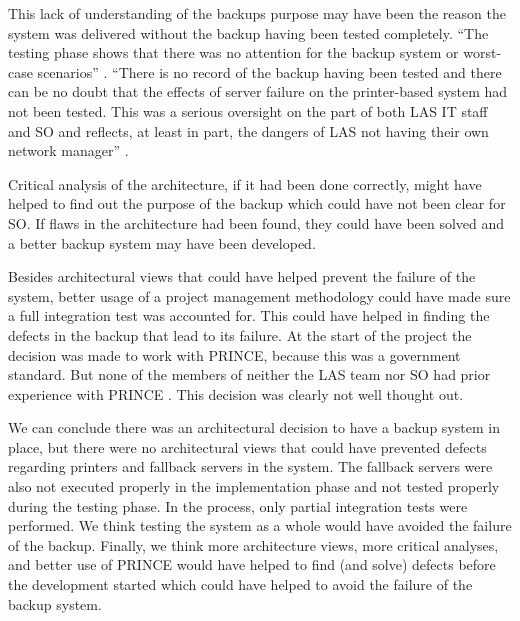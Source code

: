 This lack of understanding of the backups purpose may have been the reason the system was delivered without the backup having been tested completely.
``The testing phase shows that there was no attention for the backup system or worst-case scenarios'' \autocite[3085,3132]{officialreport}.
``There is no record of the backup having been tested and there can be no doubt that the effects of server failure on the printer-based system had not been tested.
This was a serious oversight on the part of both LAS IT staff and SO and reflects, at least in part, the dangers of LAS not having their own network manager'' \autocite[4041]{officialreport}.

Critical analysis of the architecture, if it had been done correctly, might have helped to find out the purpose of the backup which could have not been clear for SO.
If flaws in the architecture had been found, they could have been solved and a better backup system may have been developed.

Besides architectural views that could have helped prevent the failure of the system, better usage of a project management methodology could have made sure a full integration test was accounted for.
This could have helped in finding the defects in the backup that lead to its failure.
At the start of the project the decision was made to work with PRINCE, because this was a government standard.
But none of the members of neither the LAS team nor SO had prior experience with PRINCE \autocite[3068,3078]{officialreport}.
This decision was clearly not well thought out.

We can conclude there was an architectural decision to have a backup system in place,
but there were no architectural views that could have prevented defects regarding printers and fallback servers in the system.
The fallback servers were also not executed properly in the implementation phase and not tested properly during the testing phase.
In the process, only partial integration tests were performed.
We think testing the system as a whole would have avoided the failure of the backup.
Finally, we think more architecture views, more critical analyses,
and better use of PRINCE would have helped to find (and solve) defects before the development started which could have helped to avoid the failure of the backup system.